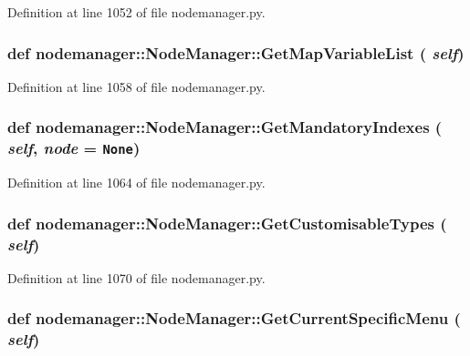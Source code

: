Definition at line 1052 of file nodemanager.py.\hypertarget{classnodemanager_1_1NodeManager_7b93c95ade6272d2c7e79e0b26b3bbe3}{
\subsubsection[GetMapVariableList]{\setlength{\rightskip}{0pt plus 5cm}def nodemanager::Node\-Manager::Get\-Map\-Variable\-List ( {\em self})}}
\label{classnodemanager_1_1NodeManager_7b93c95ade6272d2c7e79e0b26b3bbe3}




Definition at line 1058 of file nodemanager.py.\hypertarget{classnodemanager_1_1NodeManager_fa0ae7296e271effdd28a3f2fbb94778}{
\subsubsection[GetMandatoryIndexes]{\setlength{\rightskip}{0pt plus 5cm}def nodemanager::Node\-Manager::Get\-Mandatory\-Indexes ( {\em self},  {\em node} = {\tt None})}}
\label{classnodemanager_1_1NodeManager_fa0ae7296e271effdd28a3f2fbb94778}




Definition at line 1064 of file nodemanager.py.\hypertarget{classnodemanager_1_1NodeManager_38953afbd29be22621f6adab28ae3869}{
\subsubsection[GetCustomisableTypes]{\setlength{\rightskip}{0pt plus 5cm}def nodemanager::Node\-Manager::Get\-Customisable\-Types ( {\em self})}}
\label{classnodemanager_1_1NodeManager_38953afbd29be22621f6adab28ae3869}




Definition at line 1070 of file nodemanager.py.\hypertarget{classnodemanager_1_1NodeManager_9f8b78c75172bf420dcc8d9867b595a5}{
\subsubsection[GetCurrentSpecificMenu]{\setlength{\rightskip}{0pt plus 5cm}def nodemanager::Node\-Manager::Get\-Current\-Specific\-Menu ( {\em self})}}
\label{classnodemanager_1_1NodeManager_9f8b78c75172bf420dcc8d9867b595a5}




